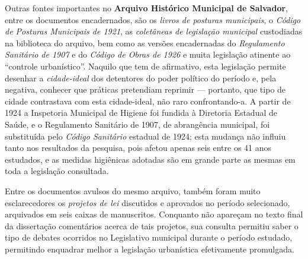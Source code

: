 Outras fontes importantes no \textbf{Arquivo Histórico Municipal de Salvador}, entre os documentos encadernados, são os \textit{livros de posturas municipais}, o \textit{Código de Posturas Municipais de 1921}, as \textit{coletâneas de legislação municipal} custodiadas na biblioteca do arquivo, bem como as versões encadernadas do \textit{Regulamento Sanitário de 1907} e do \textit{Código de Obras de 1926} e muita legislação atinente ao ``controle urbanístico''. Naquilo que tem de afirmativo, esta legislação permite desenhar a \textit{cidade-ideal} dos detentores do poder político do período e, pela negativa, conhecer que práticas pretendiam reprimir --- portanto, que tipo de cidade contrastava com esta cidade-ideal, não raro confrontando-a. A partir de 1924 a Inspetoria Municipal de Higiene foi fundida à Diretoria Estadual de Saúde, e o Regulamento Sanitário de 1907, de abrangência municipal, foi substituída pelo \textit{Código Sanitário} estadual de 1924; esta mudança não influiu tanto nos resultados da pesquisa, pois afetou apenas seis entre os 41 anos estudados, e as medidas higiênicas adotadas são em grande parte as mesmas em toda a legislação consultada.

Entre os documentos avulsos do mesmo arquivo, também foram muito esclarecedores os \textit{projetos de lei} discutidos e aprovados no período selecionado, arquivados em seis caixas de manuscritos. Conquanto não apareçam no texto final da dissertação comentários acerca de tais projetos, sua consulta permitiu saber o tipo de debates ocorridos no Legislativo municipal durante o período estudado, permitindo enquadrar melhor a legislação urbanística efetivamente promulgada.


